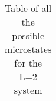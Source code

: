 
\begin{table}[H]
	\caption{Table of all the possible microstates for the L=2 system}
	\label{tab:L2_all}
\begin{tabular}{|c|p{3cm}|c|c|c}
	
\end{tabular}
\end{table}




